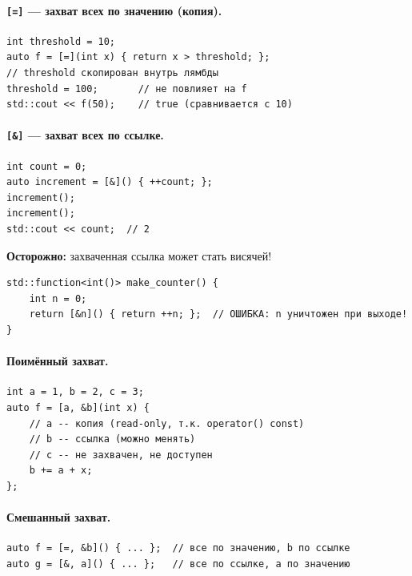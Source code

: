 \documentclass[a4paper,12pt]{article}
\begin{document}
\paragraph{\texttt{[=]} --- захват всех по значению (копия).}

\begin{lstlisting}
int threshold = 10;
auto f = [=](int x) { return x > threshold; };
// threshold скопирован внутрь лямбды
threshold = 100;       // не повлияет на f
std::cout << f(50);    // true (сравнивается с 10)
\end{lstlisting}

\paragraph{\texttt{[\&]} --- захват всех по ссылке.}

\begin{lstlisting}
int count = 0;
auto increment = [&]() { ++count; };
increment();
increment();
std::cout << count;  // 2
\end{lstlisting}

\textbf{Осторожно:} захваченная ссылка может стать висячей!

\begin{lstlisting}
std::function<int()> make_counter() {
    int n = 0;
    return [&n]() { return ++n; };  // ОШИБКА: n уничтожен при выходе!
}
\end{lstlisting}

\paragraph{Поимённый захват.}

\begin{lstlisting}
int a = 1, b = 2, c = 3;
auto f = [a, &b](int x) {
    // a -- копия (read-only, т.к. operator() const)
    // b -- ссылка (можно менять)
    // c -- не захвачен, не доступен
    b += a + x;
};
\end{lstlisting}

\paragraph{Смешанный захват.}

\begin{lstlisting}
auto f = [=, &b]() { ... };  // все по значению, b по ссылке
auto g = [&, a]() { ... };   // все по ссылке, a по значению
\end{lstlisting}
\end{document}
